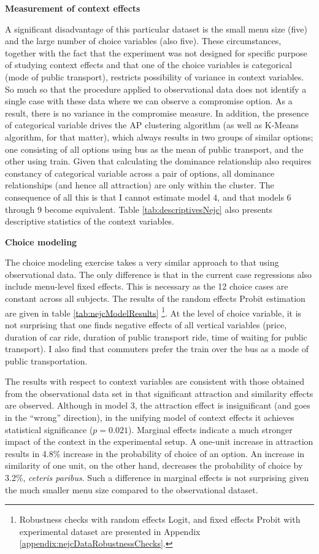 \documentclass[a4paper,12pt]{article}
\begin{document}
\textbf{Measurement of context effects}

A significant disadvantage of this particular dataset is the small menu size (five) and the large number of choice variables (also five). These circumstances, together with the fact that the experiment was not designed for specific purpose of studying context effects and that one of the choice variables is categorical (mode of public transport), restricts possibility of variance in context variables. So much so that the procedure applied to observational data does not identify a single case with these data where we can observe a compromise option. As a result, there is no variance in the compromise measure. In addition, the presence of categorical variable drives the AP clustering algorithm (as well as K-Means algorithm, for that matter), which always results in two groups of similar options; one consisting of all options using bus as the mean of public transport, and the other using train. Given that calculating the dominance relationship also requires constancy of categorical variable across a pair of options, all dominance relationships (and hence all attraction) are only within the cluster. The consequence of all this is that I cannot estimate model 4, and that models 6 through 9 become equivalent. Table \ref{tab:descriptivesNejc} also presents descriptive statistics of the context variables.

\textbf{Choice modeling}

The choice modeling exercise takes a very similar approach to that using observational data. The only difference is that in the current case regressions also include menu-level fixed effects. This is necessary as the 12 choice cases are constant across all subjects. The results of the random effects Probit estimation are given in table \ref{tab:nejcModelResults} \footnote{Robustness checks with random effects Logit, and fixed effects Probit with experimental dataset are presented in Appendix \ref{appendix:nejcDataRobustnessChecks}.}.  At the level of choice variable, it is not surprising that one finds negative effects of all vertical variables (price, duration of car ride, duration of public transport ride, time of waiting for public transport). I also find that commuters prefer the train over the bus as a mode of public transportation.

The results with respect to context variables are consistent with those obtained from the observational data set in that significant attraction and similarity effects are observed. Although in model 3, the attraction effect is insignificant (and goes in the ``wrong'' direction), in the unifying model of context effects it achieves statistical significance ($p = 0.021$). Marginal effects indicate a much stronger impact of the context in the experimental setup. A one-unit increase in attraction results in 4.8\% increase in the probability of choice of an option. An increase in similarity of one unit, on the other hand, decreases the probability of choice by 3.2\%, \textit{ ceteris paribus}. Such a difference in marginal effects is not surprising given the much smaller menu size compared to the observational dataset.
\end{document}
